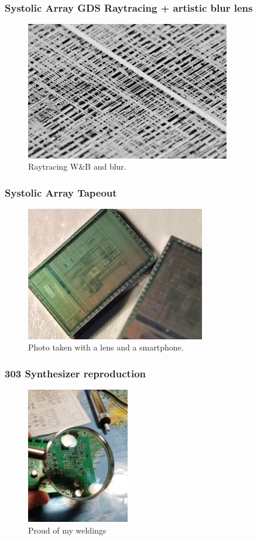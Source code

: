 \begin{frame}
	\frametitle{Systolic Array GDS Raytracing + artistic blur lens}
	\begin{figure}[H]
		\centering
		\includegraphics[width=0.8\textwidth]{teras.png}
		\caption{Raytracing W\&B and blur.}
		\label{fig:teras_raytracing}
	\end{figure}
\end{frame}

\begin{frame}
\frametitle{Systolic Array Tapeout}
\begin{figure}[H]
	\centering
	\includegraphics[width=0.7\textwidth]{tapeout_pic.jpg}
	\caption{Photo taken with a lens and a smartphone.}
\end{figure}
\end{frame}

\begin{frame}
\frametitle{303 Synthesizer reproduction}
\begin{figure}[H]
	\centering
	\includegraphics[width=0.4\textwidth]{analo_303.jpg}
	\caption{Proud of my weldings}
\end{figure}
\end{frame}

